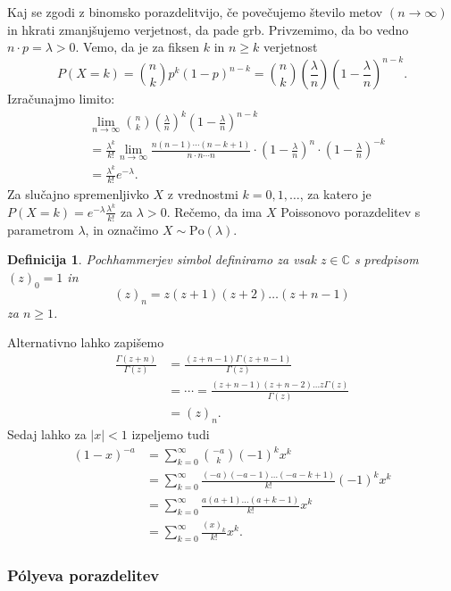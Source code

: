 \documentclass[10pt, a4paper]{article}
\newtheorem{defi}[izr]{Definicija}
\newenvironment{noticeB}{%
  \tcolorbox[%
  notitle,
  empty,
  enhanced,  %
  breakable,
  coltext=black,
  colback=white, 
  fontupper=\rmfamily,
  noparskip,
  sharp corners,
  boxrule=-1pt,  %
  frame hidden,
  left=7pt,  %
  right=7pt,
  top=5pt,
  bottom=5pt,
  before skip=2.5ex plus 2pt,
  after skip=2.5ex plus 2pt,
  borderline west = {1.5pt}{-0.1pt}{blue!30!black}, %
  overlay unbroken and last={%
    \draw[color=black, line width=1.25pt]
    ($(frame.south west)+(1.pt, -0.1pt)$) -- ++(2em, 0);
  }
  ]}
{\endtcolorbox}
\newenvironment{definicija}{\begin{noticeB}\begin{defi}}{%
    \end{defi}\end{noticeB}}
\newcommand{\C}{\mathbb {C}}
\begin{document}
Kaj se zgodi z binomsko porazdelitvijo, če povečujemo število metov $(n \to \infty)$
in hkrati zmanjšujemo verjetnost, da pade grb.
Privzemimo, da bo vedno $n \cdot p = \lambda > 0$.
Vemo, da je za fiksen $k$ in $n \geq k$ verjetnost 
$$P(X = k) = \binom{n}{k} p^k (1 - p)^{n - k} = \binom{n}{k} \left(\frac{\lambda}{n}\right) \left(1 - \frac{\lambda}{n}\right)^{n - k}.$$
Izračunajmo limito:
\begin{align*}
  &\lim_{n \to \infty} \binom{n}{k} \left(\frac{\lambda}{n}\right)^k \left(1 - \frac{\lambda}{n}\right)^{n - k}\\
  &= \frac{\lambda^k}{k!} \lim_{n \to \infty} \frac{n (n - 1) \cdots (n - k + 1)}{n \cdot n \cdots n} \cdot \left(1 - \frac{\lambda}{n}\right)^n \cdot \left(1 - \frac{\lambda}{n}\right)^{-k}\\
  &= \frac{\lambda^k}{k!} e^{-\lambda}. 
\end{align*}
Za slučajno spremenljivko $X$ z vrednostmi $k = 0, 1, \dots$,
za katero je $P(X = k) = e^{-\lambda} \frac{\lambda^k}{k!}$ za $\lambda > 0$.
Rečemo, da ima $X$ Poissonovo porazdelitev s parametrom $\lambda$, in označimo $X \sim \mathrm{Po} (\lambda)$.

\begin{definicija}
  Pochhammerjev simbol definiramo za vsak $z \in \C$ s predpisom 
  $(z)_0 = 1$ in 
  $$(z)_n = z (z + 1) (z + 2) \dots (z + n - 1)$$
  za $n \geq 1$. 
\end{definicija}

Alternativno lahko zapišemo 
\begin{align*}
  \frac{\Gamma(z + n)}{\Gamma(z)} &= \frac{(z + n - 1) \Gamma(z + n - 1)}{\Gamma(z)} \\
   &= \cdots = \frac{(z + n - 1) (z + n - 2) \dots z \Gamma(z)}{\Gamma(z)}\\
   &= (z)_n.
\end{align*}
Sedaj lahko za $|x| < 1$ izpeljemo tudi
\begin{align}
  (1 - x)^{-a} &= \sum_{k = 0} ^\infty \binom{-a}{k} (-1)^k x^k\\
  &= \sum_{k = 0} ^\infty \frac{(-a) (-a -1) \dots (-a -k + 1)}{k!} (-1)^k x^k\\
  &= \sum_{k = 0} ^\infty \frac{a (a + 1) \dots (a + k - 1)}{k!} x^k\\
  &= \sum_{k = 0} ^\infty \frac{(x)_k}{k!} x^k \label{eq:1}.
\end{align}

\subsubsection*{Pólyeva porazdelitev}
\end{document}
